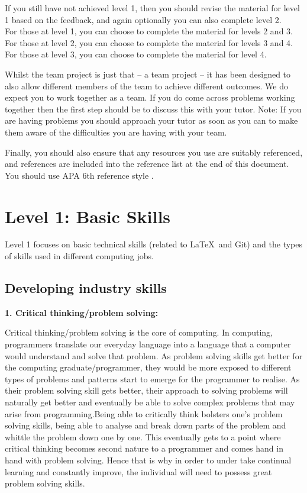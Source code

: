 \documentclass[a4paper, 11pt]{report}
\begin{document}
\begin{itemize}
    If you still have not achieved level 1, then you should revise the material for level 1 based on the feedback, and again optionally you can also complete level 2.\\
    For those at level 1, you can choose to complete the material for levels 2 and 3.\\
    For those at level 2, you can choose to complete the material for levels 3 and 4.\\
    For those at level 3, you can choose to complete the material for level 4.
\end{itemize}

Whilst the team project is just that -- a team project -- it has been designed to also allow different members of the team to achieve different outcomes. We do expect you to work together as a team. If you do come across problems working together then the first step should be to discuss this with your tutor. Note: If you are having problems you should approach your tutor as soon as you can to make them aware of the difficulties you are having with your team.

Finally, you should also ensure that any resources you use are suitably referenced, and references are included into the reference list at the end of this document. You should use APA 6th reference style \cite{apa6}.


\newpage
\section{Level 1: Basic Skills}

Level 1 focuses on basic technical skills (related to \LaTeX\ and Git) and the types of skills used in different computing jobs.

\subsection{Developing industry skills}

\indent\indent\textbf{1. Critical thinking/problem solving:}
\par Critical thinking/problem solving is the core of computing. In computing, programmers translate our everyday language into a language that a computer would understand and solve that problem. As problem solving skills get better for the computing graduate/programmer, they would be more exposed to different types of problems and patterns start to emerge for the programmer to realise. As their problem solving skill gets better, their approach to solving problems will naturally get better and eventually be able to solve complex problems that may arise from programming.Being able to critically think bolsters one’s problem solving skills, being able to analyse and break down parts of the problem and whittle the problem down one  by one. This eventually gets to a point where critical thinking becomes second nature to a programmer and comes hand in hand with problem solving. Hence that is why in order to under take continual learning and constantly improve, the individual will need to possess great problem solving skills.
\end{document}
